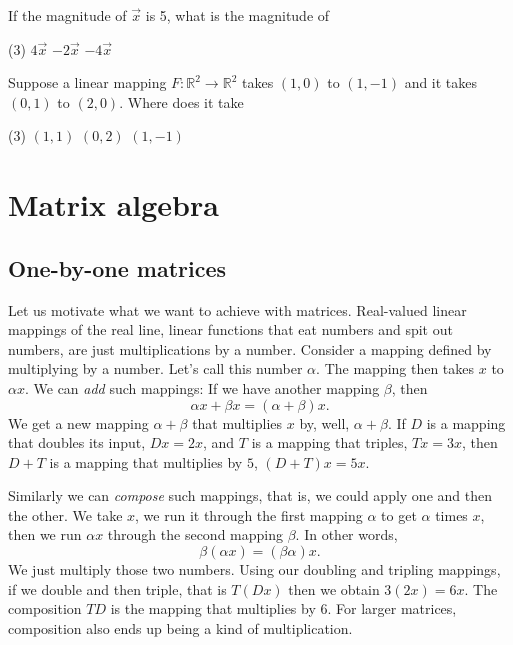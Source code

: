 \begin{exercise}
If the magnitude of $\vec{x}$ is 5, what is the magnitude of
\begin{tasks}(3)
\task
$4\vec{x}$
\task
$-2\vec{x}$
\task
$-4\vec{x}$
\end{tasks}
\end{exercise}

\begin{exercise}
Suppose a linear mapping $F \colon {\mathbb R}^2 \to {\mathbb R}^2$
takes $(1,0)$ to $(1,-1)$ and it takes $(0,1)$ to $(2,0)$. 
Where does it take
\begin{tasks}(3)
\task
$(1,1)$
\task
$(0,2)$
\task
$(1,-1)$
\end{tasks}
\end{exercise}


\sectionnewpage
\section{Matrix algebra}
\label{matalg:section}


\subsection{One-by-one matrices}

Let us motivate what we want to achieve with matrices.
Real-valued linear mappings of the real line, linear functions
that eat numbers and spit out numbers, are just multiplications by a
number.  Consider a mapping defined by multiplying by a
number.  Let's call this number $\alpha$.   The mapping then takes $x$ to
$\alpha x$.  We can
\emph{add} such mappings:
If we have another mapping $\beta$, then
\begin{equation*}
\alpha x + \beta x = (\alpha + \beta) x .
\end{equation*}
We get a new mapping $\alpha+\beta$ that multiplies $x$ by, well,
$\alpha+\beta$.  If $D$ is a mapping that doubles its input, 
$Dx = 2x$, and $T$ is a mapping that triples, $Tx = 3x$, then
$D+T$ is a mapping that multiplies by $5$, $(D+T)x = 5x$.

Similarly we can \emph{compose} such mappings, that
is, we could apply one and then the other.  We take $x$, we run it through
the first mapping $\alpha$ to get $\alpha$ times $x$, then we run
$\alpha x$ through the second mapping $\beta$.  In other words,
\begin{equation*}
\beta ( \alpha x ) = (\beta \alpha) x .
\end{equation*}
We just multiply those two numbers.  Using our doubling
and tripling mappings, if we double and then triple, that is $T(Dx)$ then
we obtain $3(2x) = 6x$.  The composition $TD$ is the mapping that multiplies
by $6$.  For larger matrices, composition also ends up being a kind of
multiplication.

